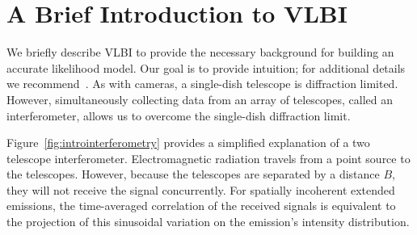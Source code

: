 
\section{A Brief Introduction to VLBI}
\label{sec:vlbi}

We briefly describe VLBI to provide the necessary background for building an accurate likelihood model. Our goal is to provide intuition; for additional details 
we recommend~\cite{thompson2008interferometry}.
As with cameras, a single-dish telescope is diffraction limited. 
However, simultaneously collecting data from an array of telescopes, called an interferometer, allows us to
overcome the single-dish diffraction limit. 



Figure~\ref{fig:introinterferometry} provides a simplified explanation of a two telescope interferometer. 
Electromagnetic radiation travels from a point source to the telescopes. However, because the telescopes are separated by a distance $B$, they will not receive the signal concurrently. 
For spatially incoherent extended emissions, the time-averaged correlation of the received signals is equivalent to the projection of this sinusoidal variation on the emission's intensity distribution.




